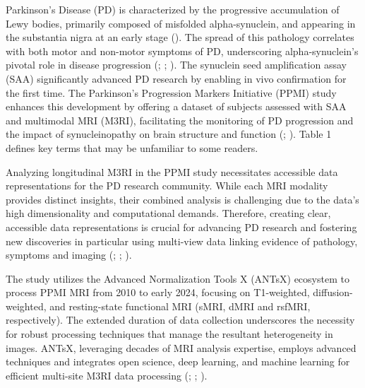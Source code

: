 \documentclass[
  table]{article}
\begin{document}
Parkinson's Disease (PD) is characterized by the progressive
accumulation of Lewy bodies, primarily composed of misfolded
alpha-synuclein, and appearing in the substantia nigra at an early stage
(). The spread of this pathology correlates with both motor and
non-motor symptoms of PD, underscoring alpha-synuclein's pivotal role in
disease progression (; ; ). The synuclein seed amplification assay (SAA) significantly
advanced PD research by enabling in vivo confirmation for the first
time. The Parkinson's Progression Markers Initiative (PPMI) study
enhances this development by offering a dataset of subjects assessed
with SAA and multimodal MRI (M3RI), facilitating the monitoring of PD
progression and the impact of synucleinopathy on brain structure and
function (; ).
Table 1 defines key terms that may be unfamiliar to some readers.

Analyzing longitudinal M3RI in the PPMI study necessitates accessible
data representations for the PD research community. While each MRI
modality provides distinct insights, their combined analysis is
challenging due to the data's high dimensionality and computational
demands. Therefore, creating clear, accessible data representations is
crucial for advancing PD research and fostering new discoveries in
particular using multi-view data linking evidence of pathology, symptoms
and imaging (;
;
).

The study utilizes the Advanced Normalization Tools X (ANTsX) ecosystem
to process PPMI MRI from 2010 to early 2024, focusing on T1-weighted,
diffusion-weighted, and resting-state functional MRI (sMRI, dMRI and
rsfMRI, respectively). The extended duration of data collection
underscores the necessity for robust processing techniques that manage
the resultant heterogeneity in images. ANTsX, leveraging decades of MRI
analysis expertise, employs advanced techniques and integrates open
science, deep learning, and machine learning for efficient multi-site
M3RI data processing (; ;
).
\end{document}
